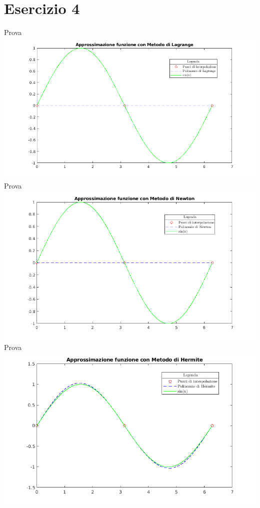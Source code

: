 \documentclass[10pt,a4paper]{report}
\begin{document}
		\section{Esercizio 4}
			Prova
			\includegraphics[width=\textwidth]{Grafici/Cap4/es4_lagrange.png}
			Prova
			\includegraphics[width=\textwidth]{Grafici/Cap4/es4_newton.png}
			Prova
			\includegraphics[width=\textwidth]{Grafici/Cap4/es4_hermite.png}
\end{document}
